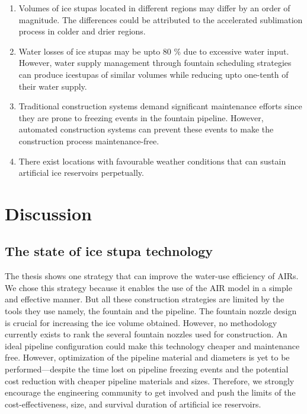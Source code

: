 \begin{enumerate} 

\item Volumes of ice stupas located in different regions may differ by an order of magnitude. The differences
  could be attributed to the accelerated sublimation process in colder and drier regions.

\item Water losses of ice stupas may be upto 80 \% due to excessive water input. However, water supply
  management through fountain scheduling strategies can produce icestupas of similar volumes while reducing upto
  one-tenth of their water supply.

\item Traditional construction systems demand significant maintenance efforts since they are prone to freezing
  events in the fountain pipeline. However, automated construction systems can prevent these events to make the
  construction process maintenance-free.

\item There exist locations with favourable weather conditions that can sustain artificial ice reservoirs
  perpetually.

\end{enumerate}

\section{Discussion}

\subsection{The state of ice stupa technology}

The thesis shows one strategy that can improve the water-use efficiency of AIRs. We chose this strategy because
it enables the use of the AIR model in a simple and effective manner. But all these construction strategies are
limited by the tools they use namely, the fountain and the pipeline. The fountain nozzle design is crucial for
increasing the ice volume obtained. However, no methodology currently exists to rank the several fountain
nozzles used for construction. An ideal pipeline configuration could make this technology cheaper and
maintenance free. However, optimization of the pipeline material and diameters is yet to be performed---despite
the time lost on pipeline freezing events and the potential cost reduction with cheaper pipeline materials and
sizes. Therefore, we strongly encourage the engineering community to get involved and push the limits of the
cost-effectiveness, size, and survival duration of artificial ice reservoirs. 

